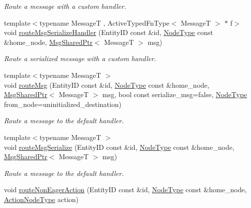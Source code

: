 \begin{DoxyCompactItemize}
\begin{DoxyCompactList}\small\item\em Route a message with a custom handler. \end{DoxyCompactList}\item 
{\footnotesize template$<$typename MessageT , Active\+Typed\+Fn\+Type$<$ Message\+T $>$ $\ast$ f$>$ }\\void \hyperlink{structvt_1_1location_1_1_entity_location_coord_ad0465263fbb33cf63819fd2c86f10cec}{route\+Msg\+Serialize\+Handler} (Entity\+ID const \&id, \hyperlink{namespacevt_a866da9d0efc19c0a1ce79e9e492f47e2}{Node\+Type} const \&home\+\_\+node, \hyperlink{namespacevt_ab2b3d506ec8e8d1540aede826d84a239}{Msg\+Shared\+Ptr}$<$ MessageT $>$ msg)
\begin{DoxyCompactList}\small\item\em Route a serialized message with a custom handler. \end{DoxyCompactList}\item 
{\footnotesize template$<$typename MessageT $>$ }\\void \hyperlink{structvt_1_1location_1_1_entity_location_coord_adead0cbbf14cc160034b55abfa5b9ca0}{route\+Msg} (Entity\+ID const \&id, \hyperlink{namespacevt_a866da9d0efc19c0a1ce79e9e492f47e2}{Node\+Type} const \&home\+\_\+node, \hyperlink{namespacevt_ab2b3d506ec8e8d1540aede826d84a239}{Msg\+Shared\+Ptr}$<$ MessageT $>$ msg, bool const serialize\+\_\+msg=false, \hyperlink{namespacevt_a866da9d0efc19c0a1ce79e9e492f47e2}{Node\+Type} from\+\_\+node=uninitialized\+\_\+destination)
\begin{DoxyCompactList}\small\item\em Route a message to the default handler. \end{DoxyCompactList}\item 
{\footnotesize template$<$typename MessageT $>$ }\\void \hyperlink{structvt_1_1location_1_1_entity_location_coord_a1a1d8dfa9ac9fdceadb5c2ef9b9cecb6}{route\+Msg\+Serialize} (Entity\+ID const \&id, \hyperlink{namespacevt_a866da9d0efc19c0a1ce79e9e492f47e2}{Node\+Type} const \&home\+\_\+node, \hyperlink{namespacevt_ab2b3d506ec8e8d1540aede826d84a239}{Msg\+Shared\+Ptr}$<$ MessageT $>$ msg)
\begin{DoxyCompactList}\small\item\em Route a message to the default handler. \end{DoxyCompactList}\item 
void \hyperlink{structvt_1_1location_1_1_entity_location_coord_ae7c1ec3412f2a16ea3f40d6bb39f23ca}{route\+Non\+Eager\+Action} (Entity\+ID const \&id, \hyperlink{namespacevt_a866da9d0efc19c0a1ce79e9e492f47e2}{Node\+Type} const \&home\+\_\+node, \hyperlink{namespacevt_a0436cb2d620dcbb21b5b49cd9c9c4749}{Action\+Node\+Type} action)

\end{DoxyCompactItemize}
